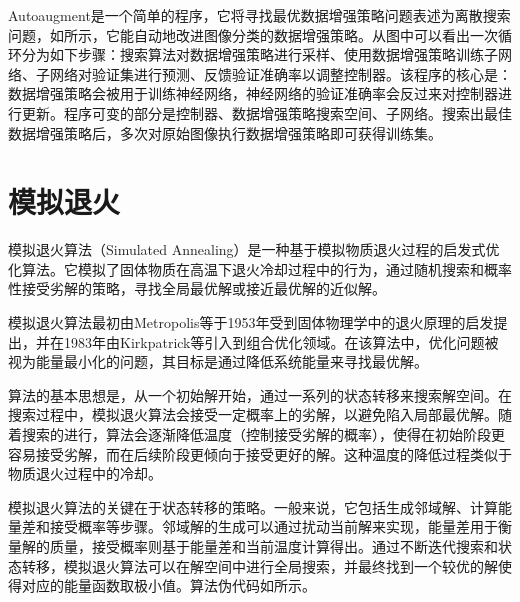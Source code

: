 {	Autoaugment\citep{Cubuk19}是一个简单的程序，它将寻找最优数据增强策略问题表述为离散搜索问题，如所示，它能自动地改进图像分类的数据增强策略。从图中可以看出一次循环分为如下步骤：搜索算法对数据增强策略进行采样、使用数据增强策略训练子网络、子网络对验证集进行预测、反馈验证准确率以调整控制器。该程序的核心是：数据增强策略会被用于训练神经网络，神经网络的验证准确率会反过来对控制器进行更新。程序可变的部分是控制器、数据增强策略搜索空间、子网络。搜索出最佳数据增强策略后，多次对原始图像执行数据增强策略即可获得训练集。
	
	
	\section{模拟退火}\label{sec:sa}
	模拟退火算法（Simulated Annealing）是一种基于模拟物质退火过程的启发式优化算法。它模拟了固体物质在高温下退火冷却过程中的行为，通过随机搜索和概率性接受劣解的策略，寻找全局最优解或接近最优解的近似解。
	
	模拟退火算法最初由Metropolis等\citep{Metropolis53}于1953年受到固体物理学中的退火原理的启发提出，并在1983年由Kirkpatrick等\citep{Kirkpatrick83}引入到组合优化领域。在该算法中，优化问题被视为能量最小化的问题，其目标是通过降低系统能量来寻找最优解。
	
	算法的基本思想是，从一个初始解开始，通过一系列的状态转移来搜索解空间。在搜索过程中，模拟退火算法会接受一定概率上的劣解，以避免陷入局部最优解。随着搜索的进行，算法会逐渐降低温度（控制接受劣解的概率），使得在初始阶段更容易接受劣解，而在后续阶段更倾向于接受更好的解\citep{Steinbrunn1997}。这种温度的降低过程类似于物质退火过程中的冷却。
	
	模拟退火算法的关键在于状态转移的策略。一般来说，它包括生成邻域解、计算能量差和接受概率等步骤。邻域解的生成可以通过扰动当前解来实现，能量差用于衡量解的质量，接受概率则基于能量差和当前温度计算得出。通过不断迭代搜索和状态转移，模拟退火算法可以在解空间中进行全局搜索，并最终找到一个较优的解使得对应的能量函数取极小值。算法伪代码如所示。
	
}
